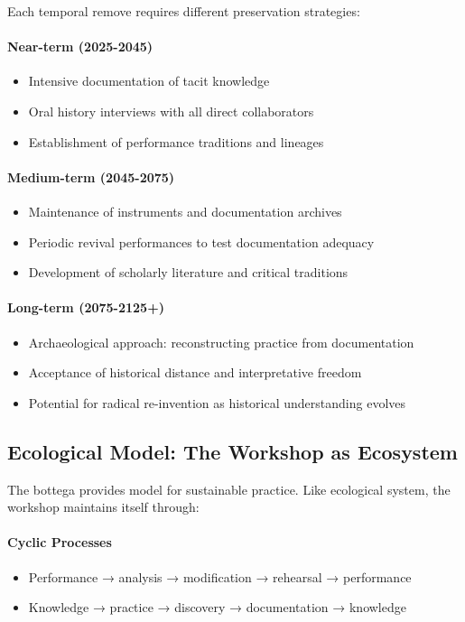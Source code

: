 Each temporal remove requires different preservation strategies:

\paragraph{Near-term (2025-2045)}
\begin{itemize}
  \item Intensive documentation of tacit knowledge
  \item Oral history interviews with all direct collaborators
  \item Establishment of performance traditions and lineages
\end{itemize}

\paragraph{Medium-term (2045-2075)}
\begin{itemize}
  \item Maintenance of instruments and documentation archives
  \item Periodic revival performances to test documentation adequacy
  \item Development of scholarly literature and critical traditions
\end{itemize}

\paragraph{Long-term (2075-2125+)}
\begin{itemize}
  \item Archaeological approach: reconstructing practice from documentation
  \item Acceptance of historical distance and interpretative freedom
  \item Potential for radical re-invention as historical understanding evolves
\end{itemize}

\subsection{Ecological Model: The Workshop as Ecosystem}

The bottega provides model for sustainable practice. Like ecological system, 
the workshop maintains itself through:

\paragraph{Cyclic Processes}
\begin{itemize}
  \item Performance → analysis → modification → rehearsal → performance
  \item Knowledge → practice → discovery → documentation → knowledge
\end{itemize}

